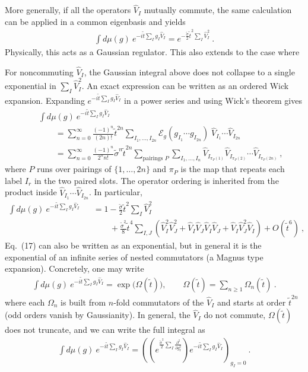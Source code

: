 \documentclass{article}
\theoremstyle{definition}
\newcommand{\nn}{\nonumber}
\newcommand{\lb}{\left(}
\newcommand{\rb}{\right)}
\newcommand{\p}{\partial}
\begin{document}
    More generally, if all the operators $\hat{V}_{I}$ mutually commute, the
    same calculation can be applied in a common eigenbasis and yields
    \begin{eqnarray}
        \int d\mu(g)\:e^{-i\tilde{t}\sum_I g_I\hat{V}_I}=e^{-\frac{\tilde{\sigma}}{2}\tilde{t}^2\sum_I \hat{V}_I^2}\ .
    \end{eqnarray}
    Physically, this acts as a Gaussian regulator. This also extends to the case
    where

    For noncommuting $\hat{V}_{I}$, the Gaussian integral above does not
    collapse to a single exponential in $\sum_{I}\hat{V}_{I}^{2}$. An exact expression
    can be written as an ordered Wick expansion. Expanding
    $e^{-i\tilde{t}\sum_I g_I\hat{V}_I}$ in a power series and using Wick's
    theorem gives
    \begin{eqnarray}
        &&\int d\mu(g)\:e^{-i\tilde{t}\sum_I g_I\hat{V}_I}\nn\\
        &&\qquad=\sum_{n=0}^\infty \frac{(-1)^{n}}{(2n)!}\tilde{t}^{2n}\sum_{I_1,\ldots,I_{2n}}\mathcal{E}_g\lb
        g_{I_1}\cdots g_{I_{2n}}\rb\;\hat{V}_{I_1}\cdots\hat{V}_{I_{2n}}\nn\\
        &&\qquad=\sum_{n=0}^\infty \frac{(-1)^{n}}{2^{n}n!}\tilde{\sigma}^n\tilde{t}^{2n}\sum_{\text{pairings }P}\sum_{I_1,\ldots,I_n}\hat{V}_{I_{\pi_P(1)}}\hat{V}_{I_{\pi_P(2)}}\cdots\hat{V}_{I_{\pi_P(2n)}}\ ,
    \end{eqnarray}
    where $P$ runs over pairings of $\{1,\ldots,2n\}$ and $\pi_{P}$ is the map
    that repeats each label $I_{r}$ in the two paired slots. The operator ordering
    is inherited from the product inside $\hat{V}_{I_1}\cdots\hat{V}_{I_{2n}}$.
    In particular,
    \begin{eqnarray}
        \int d\mu(g)\:e^{-i\tilde{t}\sum_I g_I\hat{V}_I} &&=1-\frac{\tilde{\sigma}}{2}\tilde{t}^2\sum_I
        \hat{V}_I^2\nn\\
        &&\qquad+\frac{\tilde{\sigma}^{2}}{8}\tilde{t}^4\sum_{I,J}\lb \hat{V}_I^2\hat{V}_J^2+\hat{V}_I\hat{V}_J\hat{V}_I\hat{V}_J+\hat{V}_I\hat{V}_J^2\hat{V}_I\rb+O(\tilde{t}^6)\ ,
    \end{eqnarray}
    Eq.~(17) can also be written as an exponential, but in general it is the exponential
    of an infinite series of nested commutators (a Magnus type expansion).
    Concretely, one may write
    \begin{eqnarray}
        \int d\mu(g)\:e^{-i\tilde{t}\sum_I g_I\hat{V}_I}=\exp\big(\Omega(\tilde{t})\big),\qquad
        \Omega(\tilde{t})=\sum_{n\geq 1}\Omega_n(\tilde{t})\ .
    \end{eqnarray}
    where each $\Omega_{n}$ is built from $n$-fold commutators of the $\hat{V}_{I}$
    and starts at order $\tilde{t}^{2n}$ (odd orders vanish by Gaussianity). In
    general, the $\hat{V}_{I}$ do not commute, $\Omega(\tilde{t})$ does not
    truncate, and we can write the full integral as
    \begin{eqnarray}
        \int d\mu(g)\:e^{-i\tilde{t}\sum_I g_I\hat{V}_I}=\lb \lb e^{\frac{\tilde{\sigma}^{2}}{2}\sum_I \frac{\p^{2}}{\p g^{2}_{I}}}\rb
        e^{-i \tilde{t}\sum_I g_I \hat{V}_I}\rb_{g_I=0}\ .
    \end{eqnarray}
\end{document}
